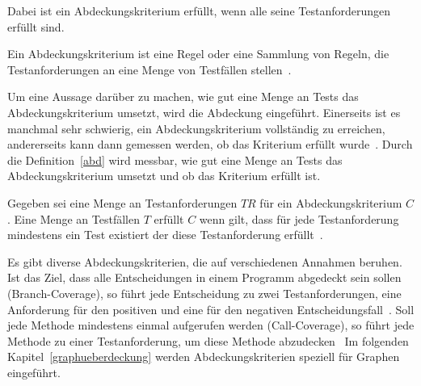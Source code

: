 Dabei ist ein Abdeckungskriterium erfüllt, wenn alle seine Testanforderungen erfüllt sind.

\begin{definition}
    Ein Abdeckungskriterium ist eine Regel oder eine Sammlung von Regeln, die Testanforderungen an eine Menge von Testfällen stellen~\cite[Def. 1.21]{software-testing}.
\end{definition}

Um eine Aussage darüber zu machen, wie gut eine Menge an Tests das Abdeckungskriterium umsetzt, wird die Abdeckung eingeführt.
Einerseits ist es manchmal sehr schwierig, ein Abdeckungskriterium vollständig zu erreichen, andererseits kann dann gemessen werden, ob das Kriterium erfüllt wurde~\cite[vgl. S. 18]{software-testing}.
Durch die Definition~\ref{abd} wird messbar, wie gut eine Menge an Tests das Abdeckungskriterium umsetzt und ob das Kriterium erfüllt ist.

\begin{definition}
    Gegeben sei eine Menge an Testanforderungen $TR$ für ein Abdeckungskriterium $C$. 
    Eine Menge an Testfällen $T$ erfüllt $C$ wenn gilt, 
    dass für jede Testanforderung mindestens ein Test existiert der diese Testanforderung erfüllt~\cite[vgl. Def. 1.22]{software-testing}.
    \label{abd}
\end{definition}

Es gibt diverse Abdeckungskriterien, die auf verschiedenen Annahmen beruhen.
Ist das Ziel, dass alle Entscheidungen in einem Programm abgedeckt sein sollen (Branch-Coverage), so führt jede Entscheidung zu zwei
Testanforderungen, eine Anforderung für den positiven und eine für den negativen Entscheidungsfall~\cite[vgl. S. 17]{software-testing}.
Soll jede Methode mindestens einmal aufgerufen werden (Call-Coverage), so führt jede Methode zu einer Testanforderung, um diese Methode abzudecken~\cite[vgl. S. 17]{software-testing}
Im folgenden Kapitel~\ref{graphueberdeckung} werden Abdeckungskriterien speziell für Graphen eingeführt.